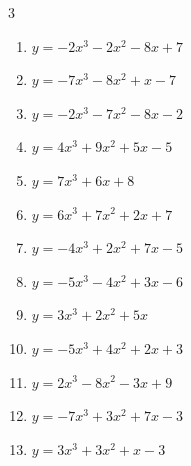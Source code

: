 \begin{multicols}{3}
\begin{enumerate}
  \item $y=-2x^{3}-2x^{2}-8x+7$


  \item $y=-7x^{3}-8x^{2}+x-7$


  \item $y=-2x^{3}-7x^{2}-8x-2$


  \item $y=4x^{3}+9x^{2}+5x-5$


  \item $y=7x^{3}+6x+8$


  \item $y=6x^{3}+7x^{2}+2x+7$


  \item $y=-4x^{3}+2x^{2}+7x-5$


  \item $y=-5x^{3}-4x^{2}+3x-6$


  \item $y=3x^{3}+2x^{2}+5x$


  \item $y=-5x^{3}+4x^{2}+2x+3$


  \item $y=2x^{3}-8x^{2}-3x+9$


  \item $y=-7x^{3}+3x^{2}+7x-3$


  \item $y=3x^{3}+3x^{2}+x-3$


\end{enumerate}
\end{multicols}
